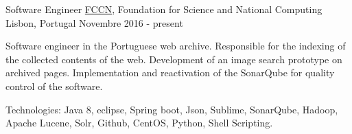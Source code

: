 


\begin{cventries}


\cventry
{Software Engineer} %
{\href{https://www.fccn.pt/en/}{FCCN}, Foundation for Science and National Computing} %
{Lisbon, Portugal} %
{Novembre 2016 - present} %
{ %
\begin{cvitems}
\item {Software engineer in the Portuguese web archive. Responsible for the indexing of the collected contents of the web. Development of an image search prototype on archived pages. Implementation and reactivation of the SonarQube for quality control of the software.}
\item {Technologies: Java 8, eclipse, Spring boot, Json, Sublime, SonarQube, Hadoop, Apache Lucene, Solr, Github, CentOS, Python, Shell Scripting.}
\end{cvitems}
}



\end{cventries}
